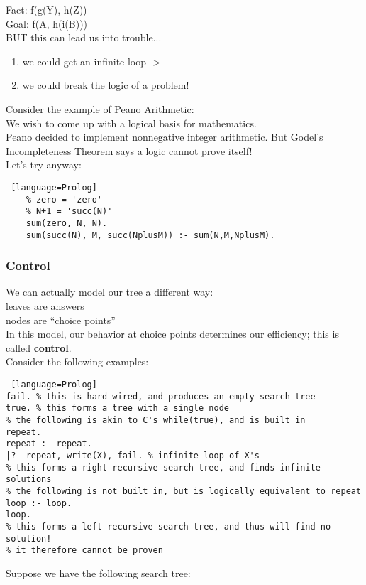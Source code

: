 \documentclass[../../lecture_notes.tex]{subfiles}
\begin{document}
\begin{center}  \end{center}		

\indent Fact: f(g(Y), h(Z))\\
\indent Goal: f(A, h(i(B)))\\
BUT this can lead us into trouble...
\begin{enumerate} [itemsep=0mm]
	\item we could get an infinite loop ->
	\item we could break the logic of a problem!
\end{enumerate}
\noindent Consider the example of Peano Arithmetic:\\
	\indent We wish to come up with a logical basis for mathematics.\\
	\indent Peano decided to implement nonnegative integer arithmetic.
	\indent But Godel's Incompleteness Theorem says a logic cannot prove itself!\\
 Let's try anyway:
 \begin{lstlisting} [language=Prolog]
	% zero = 'zero'
	% N+1 = 'succ(N)'
	sum(zero, N, N).
 	sum(succ(N), M, succ(NplusM)) :- sum(N,M,NplusM).
\end{lstlisting}

\subsubsection*{Control}
\noindent We can actually model our tree a different way:\\
	\indent leaves are answers\\
	\indent nodes are “choice points”\\
In this model, our behavior at choice points determines our efficiency; this is called \textbf{\underline{control}}.\\
Consider the following examples:
\begin{lstlisting} [language=Prolog]
fail. % this is hard wired, and produces an empty search tree
true. % this forms a tree with a single node
% the following is akin to C's while(true), and is built in
repeat.
repeat :- repeat.
|?- repeat, write(X), fail. % infinite loop of X's
% this forms a right-recursive search tree, and finds infinite solutions
% the following is not built in, but is logically equivalent to repeat
loop :- loop.
loop.
% this forms a left recursive search tree, and thus will find no solution!
% it therefore cannot be proven
\end{lstlisting}
\noindent Suppose we have the following search tree:
\end{document}
